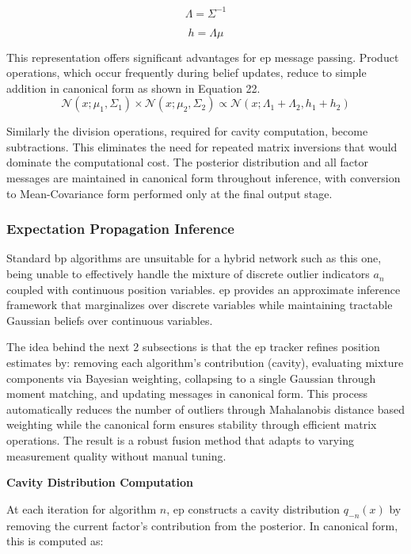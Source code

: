 \documentclass[12pt,a4paper]{article}
\begin{document}
\begin{equation}
\Lambda = \Sigma^{-1}
\end{equation}

\begin{equation}
h = \Lambda\mu
\end{equation}

This representation offers significant advantages for \acs{ep} message passing. Product operations, which occur frequently during belief updates, reduce to simple addition in canonical form as shown in Equation 22.
\begin{equation}
\mathcal{N}(x; \mu_1, \Sigma_1) \times \mathcal{N}(x; \mu_2, \Sigma_2) \propto \mathcal{N}(x; \Lambda_1 + \Lambda_2, h_1 + h_2)
\end{equation}

Similarly the division operations, required for cavity computation, become subtractions. This eliminates the need for repeated matrix inversions that would dominate the computational cost. The posterior distribution and all factor messages are maintained in canonical form throughout inference, with conversion to Mean-Covariance form performed only at the final output stage.

\subsubsection{Expectation Propagation Inference}
Standard \acs{bp} algorithms are unsuitable for a hybrid network such as this one, being unable to effectively handle the mixture of discrete outlier indicators $a_n$ coupled with continuous position variables. \acs{ep} provides an approximate inference framework that marginalizes over discrete variables while maintaining tractable Gaussian beliefs over continuous variables.

The idea behind the next 2 subsections is that the \acs{ep} tracker refines position estimates by: removing each algorithm's contribution (cavity), evaluating mixture components via Bayesian weighting, collapsing to a single Gaussian through moment matching, and updating messages in canonical form. This process automatically reduces the number of outliers through Mahalanobis distance based weighting while the canonical form ensures stability through efficient matrix operations. The result is a robust fusion method that adapts to varying measurement quality without manual tuning.

\textbf{Cavity Distribution Computation}

At each iteration for algorithm $n$, \acs{ep} constructs a cavity distribution $q_{-n}(x)$ by removing the current factor's contribution from the posterior. In canonical form, this is computed as:
\end{document}
